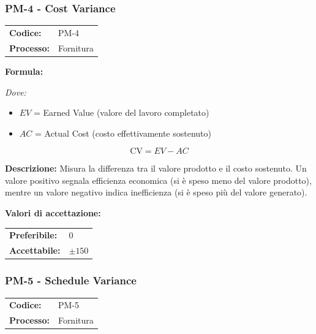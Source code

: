 \documentclass[a4paper,11pt,oneside]{scrartcl}
\begin{document}
\subsubsection{PM-4 - Cost Variance}

\noindent
\begin{tabular}{@{}p{}p{}@{}}
    \textbf{Codice:}   & PM-4      \\
    \textbf{Processo:} & Fornitura \\
\end{tabular}

\vspace{0.3cm}
\noindent\textbf{Formula:}

\noindent\textit{Dove:}
\begin{itemize}[leftmargin=1.5cm, topsep=0pt, itemsep=0pt]
    \item $EV$ = Earned Value (valore del lavoro completato)
    \item $AC$ = Actual Cost (costo effettivamente sostenuto)
\end{itemize}

\[
    \text{CV} = EV - AC
\]

\noindent\textbf{Descrizione:} Misura la differenza tra il valore prodotto e il costo sostenuto. Un valore positivo segnala efficienza economica (si è speso meno del valore prodotto), mentre un valore negativo indica inefficienza (si è speso più del valore generato).

\vspace{0.2cm}
\noindent\textbf{Valori di accettazione:}
\vspace{0.1cm}

\noindent
\begin{tabular}{@{}ll@{}}
    \textbf{Preferibile:} & $0$       \\
    \textbf{Accettabile:} & $\pm 150$ \\
\end{tabular}

\subsubsection{PM-5 - Schedule Variance}

\noindent
\begin{tabular}{@{}p{}p{}@{}}
    \textbf{Codice:}   & PM-5      \\
    \textbf{Processo:} & Fornitura \\
\end{tabular}
\end{document}
